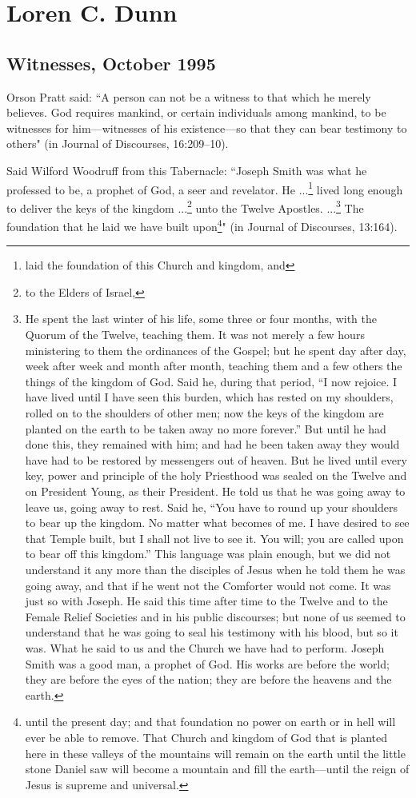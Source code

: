 \section{Loren C. Dunn}

\subsection{Witnesses, October 1995}

Orson Pratt said: ``A person can not be a witness to that which he merely believes. God requires mankind, or certain individuals among mankind, to be witnesses for him—witnesses of his existence—so that they can bear testimony to others" (in Journal of Discourses, 16:209–10).

Said Wilford Woodruff from this Tabernacle: ``Joseph Smith was what he professed to be, a prophet of God, a seer and revelator. He ...\footnote{laid the foundation of this Church and kingdom, and} lived long enough to deliver the keys of the kingdom ...\footnote{to the Elders of Israel,} unto the Twelve Apostles. ...\footnote{He spent the last winter of his life, some three or four months, with the Quorum of the Twelve, teaching them. It was not merely a few hours ministering to them the ordinances of the Gospel; but he spent day after day, week after week and month after month, teaching them and a few others the things of the kingdom of God. Said he, during that period, “I now rejoice. I have lived until I have seen this burden, which has rested on my shoulders, rolled on to the shoulders of other men; now the keys of the kingdom are planted on the earth to be taken away no more forever.” But until he had done this, they remained with him; and had he been taken away they would have had to be restored by messengers out of heaven. But he lived until every key, power and principle of the holy Priesthood was sealed on the Twelve and on President Young, as their President. He told us that he was going away to leave us, going away to rest. Said he, “You have to round up your shoulders to bear up the kingdom. No matter what becomes of me. I have desired to see that Temple built, but I shall not live to see it. You will; you are called upon to bear off this kingdom.” This language was plain enough, but we did not understand it any more than the disciples of Jesus when he told them he was going away, and that if he went not the Comforter would not come. It was just so with Joseph. He said this time after time to the Twelve and to the Female Relief Societies and in his public discourses; but none of us seemed to understand that he was going to seal his testimony with his blood, but so it was. What he said to us and the Church we have had to perform. Joseph Smith was a good man, a prophet of God. His works are before the world; they are before the eyes of the nation; they are before the heavens and the earth.} The foundation that he laid we have built upon\footnote{until the present day; and that foundation no power on earth or in hell will ever be able to remove. That Church and kingdom of God that is planted here in these valleys of the mountains will remain on the earth until the little stone Daniel saw will become a mountain and fill the earth—until the reign of Jesus is supreme and universal.}" (in Journal of Discourses, 13:164).